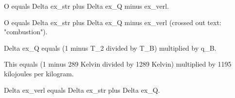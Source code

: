 O equals Delta ex_str plus Delta ex_Q minus ex_verl.  

O equals Delta ex_str plus Delta ex_Q minus ex_verl (crossed out text: "combustion").  

Delta ex_Q equals (1 minus T_2 divided by T_B) multiplied by q_B.  

This equals (1 minus 289 Kelvin divided by 1289 Kelvin) multiplied by 1195 kilojoules per kilogram.  

Delta ex_verl equals Delta ex_str plus Delta ex_Q.